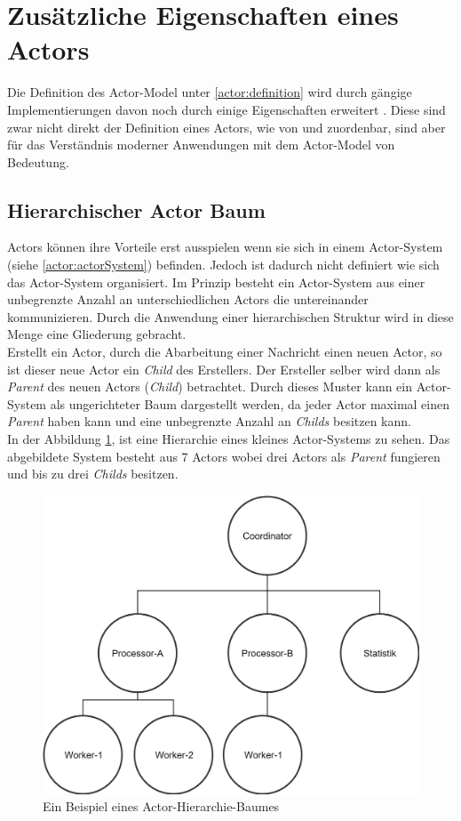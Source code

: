 \section{Zusätzliche Eigenschaften eines Actors}
Die Definition des Actor-Model unter \ref{actor:definition} wird durch gängige Implementierungen davon noch durch einige Eigenschaften erweitert \citep{Vernon2015ReactiveAkka}. Diese sind zwar nicht direkt der Definition eines Actors, wie von \cite{Hewitt1973AIntelligence} und \cite{Agha1985ActorsSystems} zuordenbar, sind aber für das Verständnis moderner Anwendungen mit dem Actor-Model von Bedeutung.
\subsection{Hierarchischer Actor Baum}
Actors können ihre Vorteile erst ausspielen wenn sie sich in einem Actor-System (siehe \ref{actor:actorSystem}) befinden. Jedoch ist dadurch nicht definiert wie sich das Actor-System organisiert. Im Prinzip besteht ein Actor-System aus einer unbegrenzte Anzahl an unterschiedlichen Actors die untereinander kommunizieren. Durch die Anwendung einer hierarchischen Struktur wird in diese Menge eine Gliederung gebracht. \\
Erstellt ein Actor, durch die Abarbeitung einer Nachricht einen neuen Actor, so ist dieser neue Actor ein \textit{Child} des Erstellers. Der Ersteller selber wird dann als \textit{Parent} des neuen Actors (\textit{Child}) betrachtet. Durch dieses Muster kann ein Actor-System als ungerichteter Baum dargestellt werden, da jeder Actor maximal einen \textit{Parent} haben kann und eine unbegrenzte Anzahl an \textit{Childs} besitzen kann. \\
In der Abbildung \ref{fig:actor:actorHierarchySample}, ist eine Hierarchie eines kleines Actor-Systems zu sehen. Das abgebildete System besteht aus 7 Actors wobei drei Actors als \textit{Parent} fungieren und bis zu drei \textit{Childs} besitzen. 
\begin{figure}
    \centering
    \includegraphics[width=0.6\linewidth]{gfx/actor/actorHierarchy}
    \caption{Ein Beispiel eines Actor-Hierarchie-Baumes}
    \label{fig:actor:actorHierarchySample}
\end{figure}

